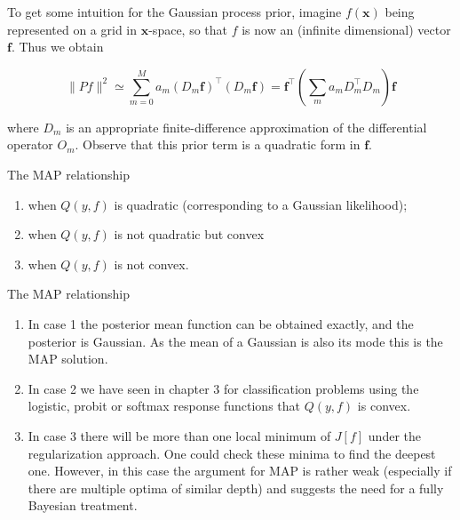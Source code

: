 \documentclass[
  ignorenonframetext,
]{beamer}
\begin{document}
\begin{frame}{}
\protect\hypertarget{section-12}{}
To get some intuition for the Gaussian process prior, imagine
\(f(\pmb x)\) being represented on a grid in \(\pmb x\)-space, so that
\(f\) is now an (infinite dimensional) vector \(\pmb f\). Thus we obtain

\[
\|P f\|^2 \simeq \sum^M _{m=0} a_m(D_m\pmb f)^{\top} (D_m \pmb f) =  \pmb f^{\top} (\sum_m a_mD_m ^{\top} D_m)\pmb f
\]

where \(D_m\) is an appropriate finite-difference approximation of the
differential operator \(O_m\). Observe that this prior term is a
quadratic form in \(\pmb f\).

\begin{block}{The MAP relationship}
\protect\hypertarget{the-map-relationship}{}
\begin{enumerate}
\item
  when \(Q(y, f)\) is quadratic (corresponding to a Gaussian
  likelihood);
\item
  when \(Q(y, f)\) is not quadratic but convex
\item
  when \(Q(y, f)\) is not convex.
\end{enumerate}
\end{block}
\end{frame}

\begin{frame}{}
\protect\hypertarget{section-13}{}
\begin{block}{The MAP relationship}
\protect\hypertarget{the-map-relationship-1}{}
\begin{enumerate}
\item
  In case 1 the posterior mean function can be obtained exactly, and the
  posterior is Gaussian. As the mean of a Gaussian is also its mode this
  is the MAP solution.
\item
  In case 2 we have seen in chapter 3 for classification problems using
  the logistic, probit or softmax response functions that \(Q(y, f)\) is
  convex.
\item
  In case 3 there will be more than one local minimum of \(J[f]\) under
  the regularization approach. One could check these minima to find the
  deepest one. However, in this case the argument for MAP is rather weak
  (especially if there are multiple optima of similar depth) and
  suggests the need for a fully Bayesian treatment.
\end{enumerate}
\end{block}
\end{frame}
\end{document}
